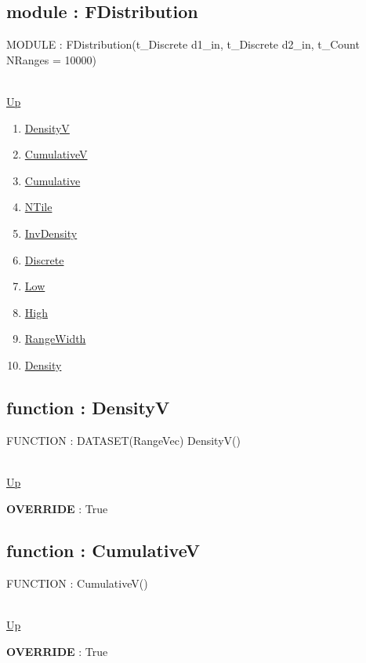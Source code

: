 \subsection*{module : FDistribution}
\hypertarget{ecldoc:linearregression.ols.fdistribution}{MODULE : FDistribution(t\_Discrete d1\_in, t\_Discrete d2\_in, t\_Count NRanges = 10000)} \\
\hyperlink{ecldoc:linearregression.ols}{Up} \\
\par
\begin{enumerate}
\item \hyperlink{ecldoc:linearregression.ols.distributionbase.densityv}{DensityV}
\item \hyperlink{ecldoc:linearregression.ols.distributionbase.cumulativev}{CumulativeV}
\item \hyperlink{ecldoc:linearregression.ols.distributionbase.cumulative}{Cumulative}
\item \hyperlink{ecldoc:linearregression.ols.distributionbase.ntile}{NTile}
\item \hyperlink{ecldoc:linearregression.ols.distributionbase.invdensity}{InvDensity}
\item \hyperlink{ecldoc:linearregression.ols.distributionbase.discrete}{Discrete}
\item \hyperlink{ecldoc:linearregression.ols.fdistribution.low}{Low}
\item \hyperlink{ecldoc:linearregression.ols.fdistribution.high}{High}
\item \hyperlink{ecldoc:linearregression.ols.fdistribution.rangewidth}{RangeWidth}
\item \hyperlink{ecldoc:linearregression.ols.fdistribution.density}{Density}
\end{enumerate}
\subsection*{function : DensityV}
\hypertarget{ecldoc:linearregression.ols.distributionbase.densityv}{FUNCTION : DATASET(RangeVec) DensityV()} \\
\hyperlink{ecldoc:linearregression.ols.fdistribution}{Up} \\
\par
\textbf{OVERRIDE} : True \\
\subsection*{function : CumulativeV}
\hypertarget{ecldoc:linearregression.ols.distributionbase.cumulativev}{FUNCTION : CumulativeV()} \\
\hyperlink{ecldoc:linearregression.ols.fdistribution}{Up} \\
\par
\textbf{OVERRIDE} : True \\
